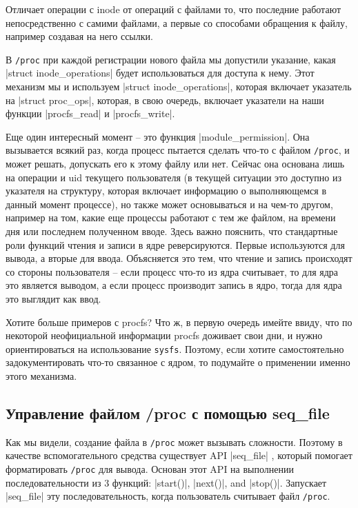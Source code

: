 \documentclass[10pt, oneside]{book}
\begin{document}
Отличает операции с inode от операций с файлами то, что последние работают непосредственно с самими файлами, а первые со способами обращения к файлу,
например создавая на него ссылки.

В \verb|/proc| при каждой регистрации нового файла мы допустили указание, какая \cpp|struct inode_operations| будет использоваться для доступа к нему. Этот механизм мы и используем \cpp|struct inode_operations|, которая включает указатель на \cpp|struct proc_ops|, которая, в свою очередь, включает указатели на наши функции \cpp|procfs_read| и \cpp|procfs_write|.

Еще один интересный момент – это функция \cpp|module_permission|.
Она вызывается всякий раз, когда процесс пытается сделать что-то с файлом \verb|/proc|, и может решать, допускать его к этому файлу или нет.
Сейчас она основана лишь на операции и uid текущего пользователя (в текущей ситуации это доступно из указателя на структуру, которая включает информацию о выполняющемся в данный момент процессе), но также может основываться и на чем-то другом, например на том, какие еще процессы работают с тем же файлом, на времени дня или последнем полученном вводе.
Здесь важно пояснить, что стандартные роли функций чтения и записи в ядре реверсируются. Первые используются для вывода, а вторые для ввода.
Объясняется это тем, что чтение и запись происходят со стороны пользователя – если процесс что-то из ядра считывает, то для ядра это является выводом, а если процесс производит запись в ядро, тогда для ядра это выглядит как ввод.


Хотите больше примеров с procfs?
 Что ж, в первую очередь имейте ввиду, что по некоторой неофициальной информации procfs доживает свои дни, и нужно ориентироваться на использование \verb|sysfs|.
Поэтому, если хотите самостоятельно задокументировать что-то связанное с ядром, то подумайте о применении именно этого механизма.

\subsection{Управление файлом /proc с помощью seq\_file}
\label{sec:manage_procfs_with_seq_file}
Как мы видели, создание файла в \verb|/proc| может вызывать сложности. Поэтому в качестве вспомогательного средства существует API \cpp|seq_file| , который помогает форматировать \verb|/proc| для вывода.
Основан этот API на выполнении последовательности из 3 функций: \cpp|start()|, \cpp|next()|, and \cpp|stop()|.
Запускает \cpp|seq_file| эту последовательность, когда пользователь считывает файл \verb|/proc|.
\end{document}
